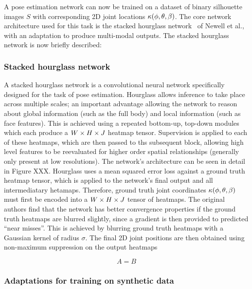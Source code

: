 A pose estimation network can now be trained on a dataset of binary silhouette images $S$ with corresponding 2D joint locations $\kappa(\phi,\theta,\beta)$. The core network architecture used for this task is the stacked hourglass network~\cite{newell2016stacked} of Newell et al., with an adaptation to produce multi-modal outputs. The stacked hourglass network is now briefly described:

\subsubsection{Stacked hourglass network}

A stacked hourglass network is a convolutional neural network specifically designed for the task of pose estimation. Hourglass allows inference to take place across multiple scales; an important advantage allowing the network to reason about global information (such as the full body) and local information (such as face features). This is achieved using a repeated bottom-up, top-down modules which each produce a $W \times H \times J$ heatmap tensor. Supervision is applied to each of these heatmaps, which are then passed to ths subsequent block, allowing high level features to be reevaluated for higher order spatial relationships (generally only present at low resolutions). The network's architecture can be seen in detail in Figure XXX. Hourglass uses a mean squared error loss against a ground truth heatmap tensor, which is applied to the network's final output and all intermediatary hetamaps. Therefore, ground truth joint coordinates $\kappa(\phi,\theta,\beta)$ must first be encoded into a $W \times H \times J$ tensor of heatmaps. The original authors find that the network has better convergence properties if the ground truth heatmaps are blurred slightly, since a gradient is then provided to predicted ``near misses''. This is achieved by blurring ground truth heatmaps with a Gaussian kernel of radius $\sigma$. The final 2D joint positions are then obtained using non-maximum suppression on the output heatmaps

\begin{equation}\label{non-max-suppression}
    A = B    
\end{equation}

\subsubsection{Adaptations for training on synthetic data}

